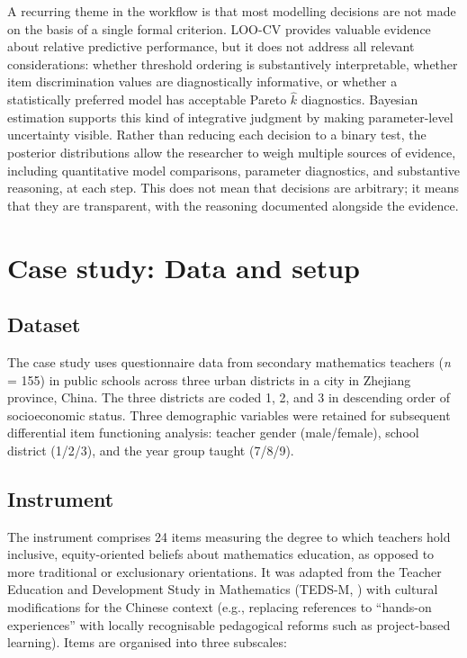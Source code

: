 \documentclass[
  man,
  floatsintext,
  longtable,
  nolmodern,
  notxfonts,
  notimes,
  colorlinks=true,linkcolor=blue,citecolor=blue,urlcolor=blue]{apa7}
\begin{document}
A recurring theme in the workflow is that most modelling decisions are
not made on the basis of a single formal criterion. LOO-CV provides
valuable evidence about relative predictive performance, but it does not
address all relevant considerations: whether threshold ordering is
substantively interpretable, whether item discrimination values are
diagnostically informative, or whether a statistically preferred model
has acceptable Pareto \(\hat{k}\) diagnostics. Bayesian estimation
supports this kind of integrative judgment by making parameter-level
uncertainty visible. Rather than reducing each decision to a binary
test, the posterior distributions allow the researcher to weigh multiple
sources of evidence, including quantitative model comparisons, parameter
diagnostics, and substantive reasoning, at each step. This does not mean
that decisions are arbitrary; it means that they are transparent, with
the reasoning documented alongside the evidence.

\section{Case study: Data and setup}\label{case-study-data-and-setup}

\subsection{Dataset}\label{dataset}

The case study uses questionnaire data from secondary mathematics
teachers (\emph{n} = 155) in public schools across three urban districts
in a city in Zhejiang province, China. The three districts are coded 1,
2, and 3 in descending order of socioeconomic status. Three demographic
variables were retained for subsequent differential item functioning
analysis: teacher gender (male/female), school district (1/2/3), and the
year group taught (7/8/9).

\subsection{Instrument}\label{instrument}

The instrument comprises 24 items measuring the degree to which teachers
hold inclusive, equity-oriented beliefs about mathematics education, as
opposed to more traditional or exclusionary orientations. It was adapted
from the Teacher Education and Development Study in Mathematics (TEDS-M,
) with cultural
modifications for the Chinese context (e.g., replacing references to
``hands-on experiences'' with locally recognisable pedagogical reforms
such as project-based learning). Items are organised into three
subscales:
\end{document}
